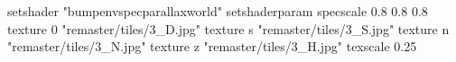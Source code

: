 setshader "bumpenvspecparallaxworld"
setshaderparam specscale 0.8 0.8 0.8
    texture 0 "remaster/tiles/3_D.jpg"
    texture s "remaster/tiles/3_S.jpg"
    texture n "remaster/tiles/3_N.jpg"
    texture z "remaster/tiles/3_H.jpg"
    texscale 0.25